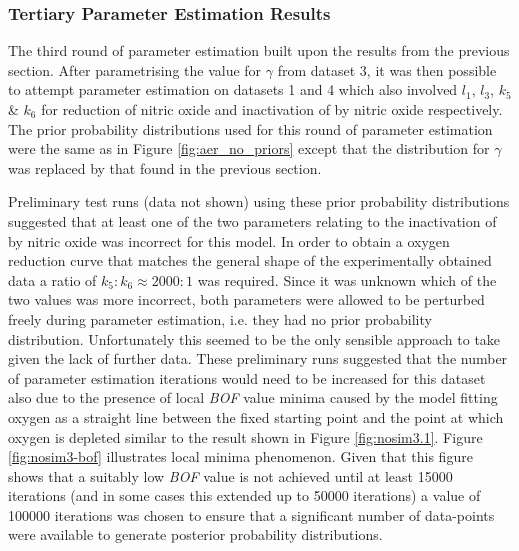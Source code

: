 \subsubsection{Tertiary Parameter Estimation Results}
The third round of parameter estimation built upon the results from the previous section. After parametrising the value for $\gamma$ from dataset 3, it was then possible to attempt parameter estimation on datasets 1 and 4 which also involved $l_1$, $l_3$, $k_5$ \& $k_6$ for reduction of nitric oxide and inactivation of \cbbthree{} by nitric oxide respectively. The prior probability distributions used for this round of parameter estimation were the same as in Figure \ref{fig:aer_no_priors} except that the distribution for $\gamma$ was replaced by that found in the previous section.

Preliminary test runs (data not shown) using these prior probability distributions suggested that at least one of the two parameters relating to the inactivation of \cbbthree{} by nitric oxide was incorrect for this model. In order to obtain a oxygen reduction curve that matches the general shape of the experimentally obtained data a ratio of $k_5:k_6 \approx 2000:1$ was required. Since it was unknown which of the two values was more incorrect, both parameters were allowed to be perturbed freely during parameter estimation, i.e. they had no prior probability distribution. Unfortunately this seemed to be the only sensible approach to take given the lack of further data. These preliminary runs suggested that the number of parameter estimation iterations would need to be increased for this dataset also due to the presence of local \textit{BOF} value minima caused by the model fitting oxygen as a straight line between the fixed starting point and the point at which oxygen is depleted similar to the result shown in Figure \ref{fig:nosim3.1}. Figure \ref{fig:nosim3-bof} illustrates local minima phenomenon. Given that this figure shows that a suitably low \textit{BOF} value is not achieved until at least 15000 iterations (and in some cases this extended up to 50000 iterations) a value of 100000 iterations was chosen to ensure that a significant number of data-points were available to generate posterior probability distributions.

